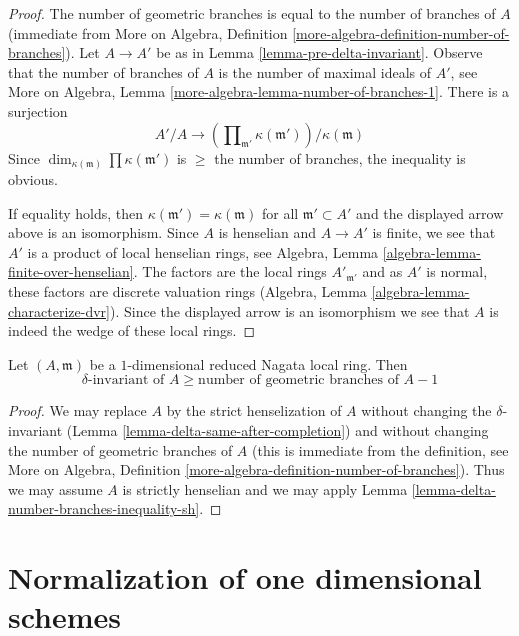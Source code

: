 \begin{proof}
The number of geometric branches is equal to the number of branches of $A$
(immediate from
More on Algebra, Definition \ref{more-algebra-definition-number-of-branches}).
Let $A \to A'$ be as in Lemma \ref{lemma-pre-delta-invariant}.
Observe that the number of branches of $A$ is the number
of maximal ideals of $A'$, see
More on Algebra, Lemma \ref{more-algebra-lemma-number-of-branches-1}.
There is a surjection
$$
A'/A \longrightarrow
\left(\prod\nolimits_{\mathfrak m'} \kappa(\mathfrak m')\right)/
\kappa(\mathfrak m)
$$
Since $\dim_{\kappa(\mathfrak m)} \prod \kappa(\mathfrak m')$
is $\geq$ the number of branches, the inequality is obvious.

\medskip\noindent
If equality holds, then $\kappa(\mathfrak m') = \kappa(\mathfrak m)$
for all $\mathfrak m' \subset A'$ and the displayed arrow above
is an isomorphism. Since $A$ is henselian and
$A \to A'$ is finite, we see that $A'$ is a product of local
henselian rings, see Algebra, Lemma \ref{algebra-lemma-finite-over-henselian}.
The factors are the local rings $A'_{\mathfrak m'}$ and as
$A'$ is normal, these factors are discrete valuation rings
(Algebra, Lemma \ref{algebra-lemma-characterize-dvr}).
Since the displayed arrow is an isomorphism we see that
$A$ is indeed the wedge of these local rings.
\end{proof}

\begin{lemma}
\label{lemma-delta-number-branches-inequality}
Let $(A, \mathfrak m)$ be a $1$-dimensional reduced Nagata local ring. Then
$$
\delta\text{-invariant of }A \geq \text{number of geometric branches of }A - 1
$$
\end{lemma}

\begin{proof}
We may replace $A$ by the strict henselization of $A$ without
changing the $\delta$-invariant
(Lemma \ref{lemma-delta-same-after-completion}) and
without changing the number of geometric branches of $A$
(this is immediate from the definition, see
More on Algebra, Definition \ref{more-algebra-definition-number-of-branches}).
Thus we may assume $A$ is strictly henselian and we may
apply Lemma \ref{lemma-delta-number-branches-inequality-sh}.
\end{proof}






\section{Normalization of one dimensional schemes}
\label{section-normalization-one-dimensional}

